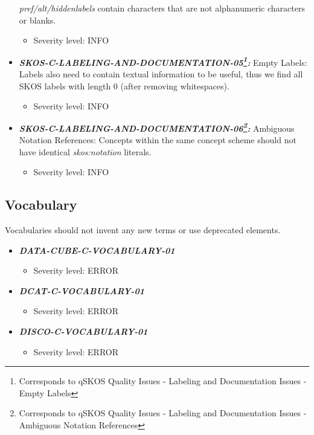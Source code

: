 \documentclass{llncs}
\begin{document}
\begin{itemize}
	\emph{pref/alt/hiddenlabels} contain characters that are not alphanumeric characters or blanks.
	\begin{itemize}
		\item Severity level: INFO
	\end{itemize}
	\item \textbf{{\em SKOS-C-LABELING-AND-DOCUMENTATION-05\footnote{Corresponds to qSKOS Quality Issues - Labeling and Documentation Issues - Empty Labels}:}}
	Empty Labels:
	Labels also need to contain textual information to be useful, thus we find all SKOS labels with length 0 (after removing whitespaces). 
	\begin{itemize}
		\item Severity level: INFO
	\end{itemize}
	\item \textbf{{\em SKOS-C-LABELING-AND-DOCUMENTATION-06\footnote{Corresponds to qSKOS Quality Issues - Labeling and Documentation Issues - Ambiguous Notation References}:}}
	Ambiguous Notation References:
	Concepts within the same concept scheme should not have identical \emph{skos:notation} literals. 
	\begin{itemize}
		\item Severity level: INFO
	\end{itemize}
\end{itemize}

\subsection{Vocabulary}
Vocabularies should not invent any new terms or use deprecated elements. 

\begin{itemize}
	\item \textbf{\em DATA-CUBE-C-VOCABULARY-01} 
	\begin{itemize}
		\item Severity level: ERROR
	\end{itemize}
\end{itemize}

\begin{itemize}
	\item \textbf{\em DCAT-C-VOCABULARY-01} 
	\begin{itemize}
		\item Severity level: ERROR
	\end{itemize}
\end{itemize}

\begin{itemize}
	\item \textbf{\em DISCO-C-VOCABULARY-01} 
	\begin{itemize}
		\item Severity level: ERROR
	\end{itemize}
\end{itemize}
\end{document}
